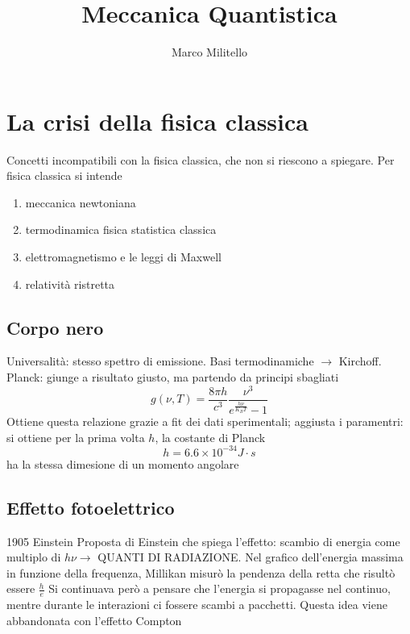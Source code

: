 \documentclass[a4paper,11pt]{report}
\theoremstyle{remark}
\theoremstyle{definition}
\begin{document}
	\date{}
	\author{Marco Militello}
	\title{Meccanica Quantistica}
	\maketitle
	\tableofcontents
	\newpage
	
\chapter{La crisi della fisica classica}

Concetti incompatibili con la fisica classica, che non si riescono a spiegare. Per fisica classica si intende
\begin{enumerate}
    \item meccanica newtoniana
    \item termodinamica fisica statistica classica
    \item elettromagnetismo e le leggi di Maxwell
    \item relatività ristretta
\end{enumerate}

\section{Corpo nero}

Universalità: stesso spettro di emissione. Basi termodinamiche $\rightarrow$ Kirchoff.  Planck: giunge a risultato giusto, ma partendo da principi sbagliati
\begin{equation*}
    g(\nu, T) = \frac{8\pi h}{c^3} \frac{\nu^3}{e^{\frac{h\nu}{K_B T}}-1}
\end{equation*}
Ottiene questa relazione grazie a fit dei dati sperimentali; aggiusta i paramentri: si ottiene per la prima volta $h$, la costante di Planck
\begin{equation}
    h = 6.6 \times 10^{-34} J \cdot s
\end{equation}
ha la stessa dimesione di un momento angolare

\section{Effetto fotoelettrico}

1905 Einstein \newline
Proposta di Einstein che spiega l'effetto: scambio di energia come multiplo di $h\nu \rightarrow$ QUANTI DI RADIAZIONE. \newline
Nel grafico dell'energia massima in funzione della frequenza, Millikan misurò la pendenza della retta che risultò essere $\frac{h}{e}$
Si continuava però a pensare che l'energia si propagasse nel continuo, mentre durante le interazioni ci fossere scambi a pacchetti. Questa idea viene abbandonata con l'effetto Compton
\end{document}
